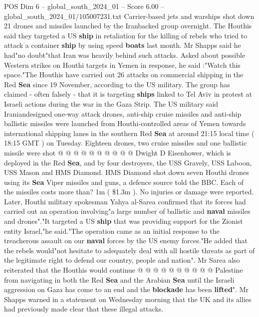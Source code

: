 \begin{textsample}{POS Dim 6 – global\_south\_2024\_01 – Score 6.00 – global\_south\_2024\_01/105007231.txt}  \label{ex:f6_pos_090}
Carrier-based jets and warships shot down 21 drones and missiles launched by the Iranbacked group overnight.
The Houthis said they targeted a US \textbf{ship} in retaliation for the killing of rebels who tried to attack a container \textbf{ship} by using speed \textbf{boats} last month.
Mr Shapps said he had"no doubt"that Iran was heavily behind such attacks.
Asked about possible Western strikes on Houthi targets in Yemen in response, he said :"Watch this space."The Houthis have carried out 26 attacks on commercial shipping in the Red \textbf{Sea} since 19 November, according to the US military.
The group has claimed - often falsely - that it is targeting \textbf{ships} linked to Tel Aviv in protest at Israeli actions during the war in the Gaza Strip.
The US military said Iraniandesigned one-way attack drones, anti-ship cruise missiles and anti-ship ballistic missiles were launched from Houthi-controlled areas of Yemen towards international shipping lanes in the southern Red \textbf{Sea} at around 21:15 local time ( 18:15 GMT ) on Tuesday.
Eighteen drones, two cruise missiles and one ballistic missile were shot @ @ @ @ @ @ @ @ @ @ Dwight D Eisenhower, which is deployed in the Red \textbf{Sea}, and by four destroyers, the USS Gravely, USS Laboon, USS Mason and HMS Diamond.
HMS Diamond shot down seven Houthi drones using its \textbf{Sea} Viper missiles and guns, a defence source told the BBC.
Each of the missiles costs more than? 1m ( \$1.3m ).
No injuries or damage were reported.
Later, Houthi military spokesman Yahya al-Sarea confirmed that its forces had carried out an operation involving"a large number of ballistic and \textbf{naval} missiles and drones"."It targeted a US \textbf{ship} that was providing support for the Zionist entity Israel,"he said."The operation came as an initial response to the treacherous assault on our \textbf{naval} forces by the US enemy forces."He added that the rebels would"not hesitate to adequately deal with all hostile threats as part of the legitimate right to defend our country, people and nation".
Mr Sarea also reiterated that the Houthis would continue @ @ @ @ @ @ @ @ @ @ Palestine from navigating in both the Red \textbf{Sea} and the Arabian \textbf{Sea} until the Israeli aggression on Gaza has come to an end and the \textbf{blockade} has been \textbf{lifted}".
Mr Shapps warned in a statement on Wednesday morning that the UK and its allies had previously made clear that these illegal attacks.

\end{textsample}
